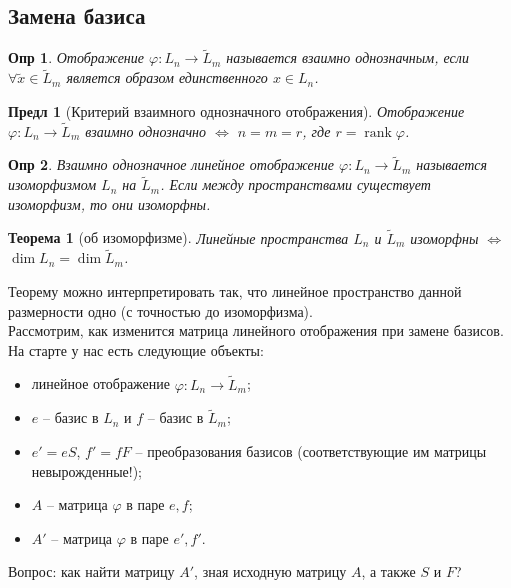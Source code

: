 \documentclass[a4paper,12pt]{article}
\DeclareMathOperator{\rank}{\mathop{rank}}
\newtheorem*{definition}{Опр}
\newtheorem{theorem}{Теорема}[section]
\newtheorem{propos}{Предл}[section]
\begin{document}
\subsection{Замена базиса}

\begin{definition}
	Отображение $\varphi: L_n \to \tilde{L}_m$ называется взаимно однозначным, если $\forall \tilde{x} \in \tilde{L}_m$ является образом единственного $x \in L_n$.
\end{definition}

\begin{propos}[Критерий взаимного однозначного отображения]
	Отображение $\varphi: L_n \to \tilde{L}_m$ взаимно однозначно $\Leftrightarrow$ $n = m = r$, где $r = \rank \varphi$.
\end{propos}

\begin{definition}
	Взаимно однозначное линейное отображение $\varphi: L_n \to \tilde{L}_m$ называется изоморфизмом $L_n$ на $\tilde{L}_m$. Если между пространствами существует изоморфизм, то они изоморфны.
\end{definition}

\begin{theorem}[об изоморфизме]
	Линейные пространства $L_n$ и $\tilde{L}_m$ изоморфны $\Leftrightarrow$ $\dim L_n = \dim \tilde{L}_m$.
\end{theorem}

Теорему можно интерпретировать так, что линейное пространство данной размерности одно (с точностью до изоморфизма). \\


Рассмотрим, как изменится матрица линейного отображения при замене базисов. На старте у нас есть следующие объекты: 
\begin{itemize}
	\item линейное отображение $\varphi: L_n \to \tilde{L}_m$;
	\item $e$ -- базис в $L_n$ и $f$ -- базис в $\tilde{L}_m$;
	\item $e' = eS$, $f' = fF$ -- преобразования базисов (соответствующие им матрицы невырожденные!);
	\item $A$ -- матрица $\varphi$ в паре $e,f$;
	\item $A'$ -- матрица $\varphi$ в паре $e', f'$.
\end{itemize}
Вопрос: как найти матрицу $A'$, зная исходную матрицу $A$, а также $S$ и $F$? 
\end{document}
